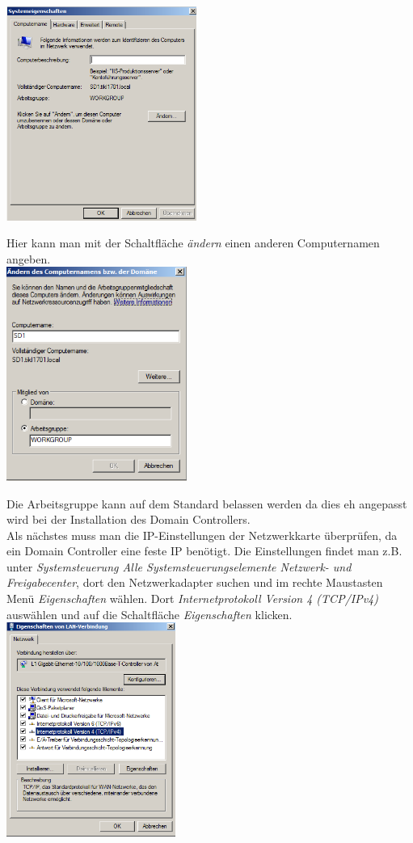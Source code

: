 \documentclass[12pt,a4paper,titlepage]{article} %
\begin{document}
	\includegraphics[height=7cm]{Bilder/002}
	
Hier kann man mit der Schaltfläche \emph{ändern} einen anderen Computernamen angeben.\\

	\includegraphics[height=7cm]{Bilder/003}
	
Die Arbeitsgruppe kann auf dem Standard belassen werden da dies eh angepasst wird bei der Installation des Domain Controllers.\\
Als nächstes muss man die IP-Einstellungen der Netzwerkkarte überprüfen, da ein Domain Controller eine feste IP benötigt. Die Einstellungen findet man z.B. unter \emph{Systemsteuerung  Alle Systemsteuerungselemente  Netzwerk- und Freigabecenter}, dort den Netzwerkadapter suchen und im rechte Maustasten Menü \emph{Eigenschaften} wählen. Dort \emph{Internetprotokoll Version 4 (TCP/IPv4)} auswählen und auf die Schaltfläche \emph{Eigenschaften} klicken.\\ %

	\includegraphics[height=7cm]{Bilder/004}\\
	
\end{document}
